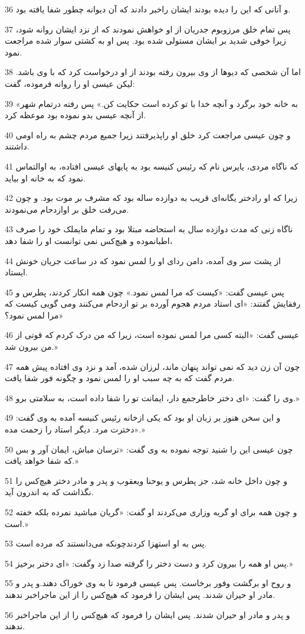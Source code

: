 \par 36 و آنانی که این را دیده بودند ایشان راخبر دادند که آن دیوانه چطور شفا یافته بود.
\par 37 پس تمام خلق مرزوبوم جدریان از او خواهش نمودند که از نزد ایشان روانه شود، زیرا خوفی شدید بر ایشان مستولی شده بود. پس او به کشتی سوار شده مراجعت نمود.
\par 38 اما آن شخصی که دیوها از وی بیرون رفته بودند از او درخواست کرد که با وی باشد. لیکن عیسی او را روانه فرموده، گفت:
\par 39 «به خانه خود برگرد و آنچه خدا با تو کرده است حکایت کن.» پس رفته درتمام شهر از آنچه عیسی بدو نموده بود موعظه کرد.
\par 40 و چون عیسی مراجعت کرد خلق او راپذیرفتند زیرا جمیع مردم چشم به راه اومی داشتند.
\par 41 که ناگاه مردی، یایرس نام که رئیس کنیسه بود به پایهای عیسی افتاده، به اوالتماس نمود که به خانه او بیاید.
\par 42 زیرا که او رادختر یگانه‌ای قریب به دوازده ساله بود که مشرف بر موت بود. و چون می‌رفت خلق بر اوازدحام می‌نمودند.
\par 43 ناگاه زنی که مدت دوازده سال به استحاضه مبتلا بود و تمام مایملک خود را صرف اطبانموده و هیچ‌کس نمی توانست او را شفا دهد،
\par 44 از پشت سر وی آمده، دامن ردای او را لمس نمود که در ساعت جریان خونش ایستاد.
\par 45 پس عیسی گفت: «کیست که مرا لمس نمود.» چون همه انکار کردند، پطرس و رفقایش گفتند: «ای استاد مردم هجوم آورده بر تو ازدحام می‌کنند ومی گویی کیست که مرا لمس نمود؟»
\par 46 عیسی گفت: «البته کسی مرا لمس نموده است، زیرا که من درک کردم که قوتی از من بیرون شد.»
\par 47 چون آن زن دید که نمی تواند پنهان ماند، لرزان شده، آمد و نزد وی افتاده پیش همه مردم گفت که به چه سبب او را لمس نمود و چگونه فور شفا یافت.
\par 48 وی را گفت: «ای دختر خاطرجمع دار، ایمانت تو را شفا داده است، به سلامتی برو.»
\par 49 و این سخن هنوز بر زبان او بود که یکی ازخانه رئیس کنیسه آمده به وی گفت: «دخترت مرد. دیگر استاد را زحمت مده.»
\par 50 چون عیسی این را شنید توجه نموده به وی گفت: «ترسان مباش، ایمان آور و بس که شفا خواهد یافت.»
\par 51 و چون داخل خانه شد، جز پطرس و یوحنا ویعقوب و پدر و مادر دختر هیچ‌کس را نگذاشت که به اندرون آید.
\par 52 و چون همه برای او گریه وزاری می‌کردند او گفت: «گریان مباشید نمرده بلکه خفته است.»
\par 53 پس به او استهزا کردندچونکه می‌دانستند که مرده است.
\par 54 پس او همه را بیرون کرد و دست دختر را گرفته صدا زد وگفت: «ای دختر برخیز.»
\par 55 و روح او برگشت وفور برخاست. پس عیسی فرمود تا به وی خوراک دهند.و پدر و مادر او حیران شدند. پس ایشان را فرمود که هیچ‌کس را از این ماجراخبر ندهند.
\par 56 و پدر و مادر او حیران شدند. پس ایشان را فرمود که هیچ‌کس را از این ماجراخبر ندهند.

